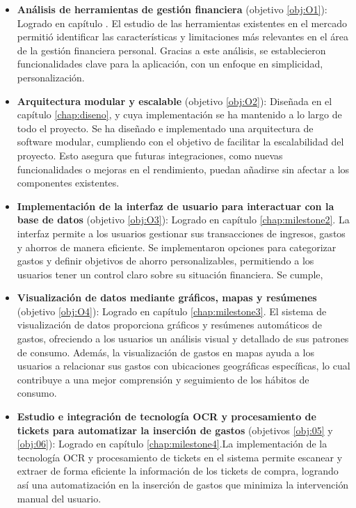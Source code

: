 \begin{itemize}
    \item \textbf{Análisis de herramientas de gestión financiera} (objetivo \ref{obj:O1}): Logrado en capítulo \label{chap:estado_del_arte}. El estudio de las herramientas existentes en el mercado permitió identificar las características y limitaciones más relevantes en el área de la gestión financiera personal. Gracias a este análisis, se establecieron funcionalidades clave para la aplicación, con un enfoque en simplicidad, personalización.

    \item \textbf{Arquitectura modular y escalable} (objetivo \ref{obj:O2}): Diseñada en el capítulo \ref{chap:diseno}, y cuya implementación se ha mantenido a lo largo de todo el proyecto. Se ha diseñado e implementado una arquitectura de software modular, cumpliendo con el objetivo de facilitar la escalabilidad del proyecto. Esto asegura que futuras integraciones, como nuevas funcionalidades o mejoras en el rendimiento, puedan añadirse sin afectar a los componentes existentes.

    \item \textbf{Implementación de la interfaz de usuario para interactuar con la base de datos} (objetivo \ref{obj:O3}): Logrado en capítulo \ref{chap:milestone2}. La interfaz permite a los usuarios gestionar sus transacciones de ingresos, gastos y ahorros de manera eficiente. Se implementaron opciones para categorizar gastos y definir objetivos de ahorro personalizables, permitiendo a los usuarios tener un control claro sobre su situación financiera. Se cumple,

    \item \textbf{Visualización de datos mediante gráficos, mapas y resúmenes} (objetivo \ref{obj:O4}): Logrado en capítulo \ref{chap:milestone3}. El sistema de visualización de datos proporciona gráficos y resúmenes automáticos de gastos, ofreciendo a los usuarios un análisis visual y detallado de sus patrones de consumo. Además, la visualización de gastos en mapas ayuda a los usuarios a relacionar sus gastos con ubicaciones geográficas específicas, lo cual contribuye a una mejor comprensión y seguimiento de los hábitos de consumo.
    
    \item \textbf{Estudio e integración de tecnología OCR y procesamiento de tickets para automatizar la inserción de gastos} (objetivos \ref{obj:05} y \ref{obj:06}): Logrado en capítulo \ref{chap:milestone4}.La implementación de la tecnología OCR y procesamiento de tickets en el sistema permite escanear y extraer de forma eficiente la información de los tickets de compra, logrando así una automatización en la inserción de gastos que minimiza la intervención manual del usuario. 


\end{itemize}
